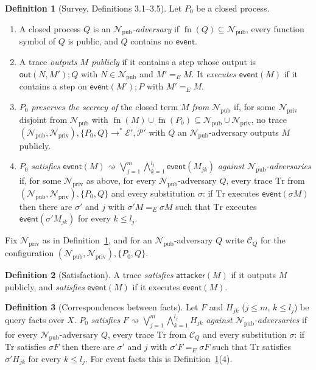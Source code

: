 \documentclass[11pt]{article}
\theoremstyle{definition}
\newtheorem{definition}{Definition}[section]
\theoremstyle{plain}
\theoremstyle{remark}
\newcommand{\pv}[1]{\mathsf{#1}}
\newcommand{\Npub}{\mathcal{N}_{\mathrm{pub}}}
\newcommand{\Npriv}{\mathcal{N}_{\mathrm{priv}}}
\newcommand{\fn}{\operatorname{fn}}
\newcommand{\attacker}{\pv{attacker}}
\newcommand{\event}{\pv{event}}
\newcommand{\red}[1]{\text{(Red #1)}}
\newcommand{\CQ}{\mathcal{C}_Q}
\begin{document}
\begin{definition}[Survey, Definitions 3.1--3.5]\label{def:survey}
Let $P_0$ be a closed process.
\begin{enumerate}
\item A closed process $Q$ is an \emph{$\Npub$-adversary} if $\fn(Q)\subseteq\Npub$, every function symbol of $Q$ is public, and $Q$ contains no $\pv{event}$.
\item A trace \emph{outputs $M$ publicly} if it contains a step \red{I/O$'$} whose output is $\pv{out}(N,M');Q$ with $N\in\Npub$ and $M'=_E M$. It \emph{executes $\pv{event}(M)$} if it contains a step \red{Event} on $\pv{event}(M');P$ with $M'=_E M$.
\item $P_0$ \emph{preserves the secrecy of} the closed term $M$ \emph{from} $\Npub$ if, for some $\Npriv$ disjoint from $\Npub$ with $\fn(M)\cup\fn(P_0)\subseteq\Npub\cup\Npriv$, no trace $(\Npub,\Npriv),\{P_0,Q\}\to^*\mathcal{E}',\mathcal{P}'$ with $Q$ an $\Npub$-adversary outputs $M$ publicly.
\item $P_0$ \emph{satisfies} $\event(M)\rightsquigarrow\bigvee_{j=1}^m\bigwedge_{k=1}^{l_j}\event(M_{jk})$ \emph{against $\Npub$-adversaries} if, for some $\Npriv$ as above, for every $\Npub$-adversary $Q$, every trace $\mathrm{Tr}$ from $(\Npub,\Npriv),\{P_0,Q\}$ and every substitution $\sigma$: if $\mathrm{Tr}$ executes $\pv{event}(\sigma M)$ then there are $\sigma'$ and $j$ with $\sigma'M=_E\sigma M$ such that $\mathrm{Tr}$ executes $\pv{event}(\sigma'M_{jk})$ for every $k\le l_j$.
\end{enumerate}
\end{definition}

Fix $\Npriv$ as in Definition~\ref{def:survey}, and for an $\Npub$-adversary $Q$ write $\CQ$ for the configuration $(\Npub,\Npriv),\{P_0,Q\}$.

\begin{definition}[Satisfaction]\label{def:satisfies}
A trace \emph{satisfies} $\attacker(M)$ if it outputs $M$ publicly, and \emph{satisfies} $\event(M)$ if it executes $\pv{event}(M)$.
\end{definition}

\begin{definition}[Correspondences between facts]\label{def:corr-facts}
Let $F$ and $H_{jk}$ ($j\le m$, $k\le l_j$) be query facts over $X$. $P_0$ \emph{satisfies} $F\rightsquigarrow\bigvee_{j=1}^m\bigwedge_{k=1}^{l_j}H_{jk}$ \emph{against $\Npub$-adversaries} if for every $\Npub$-adversary $Q$, every trace $\mathrm{Tr}$ from $\CQ$ and every substitution $\sigma$: if $\mathrm{Tr}$ satisfies $\sigma F$ then there are $\sigma'$ and $j$ with $\sigma'F=_E\sigma F$ such that $\mathrm{Tr}$ satisfies $\sigma'H_{jk}$ for every $k\le l_j$. For event facts this is Definition~\ref{def:survey}(4).
\end{definition}
\end{document}
